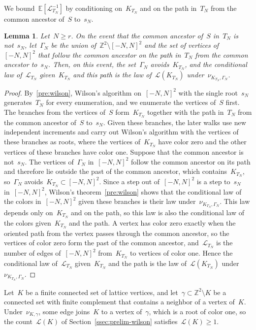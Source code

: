 \documentclass[11pt]{amsart}
\numberwithin{equation}{section}
\newtheorem{lemma}[equation]{Lemma}
\newcommand{\Z}{\mathbb Z}
\newcommand{\EE}{\mathbb E}
\newcommand{\cL}{\mathscr{L}}
\begin{document}
We bound~$\EE[\cL_{T_N}^{-1}]$ by conditioning on~$K_{T_N}$ and on the path in~$T_N$ from the common ancestor of~$S$ to~$s_N$.

\begin{lemma}\label{rd:conditional-law}
Let~$N\geq r$. On the event that the common ancestor of~$S$ in~$T_N$ is not~$s_N$, let~$\Gamma_N$ be the union of~$\Z^2\setminus [-N,N]^2$ and the set of vertices of~$[-N,N]^2$ that follow the common ancestor on the path in~$T_N$ from the common ancestor to~$s_N$. Then, on this event, the set~$\Gamma_N$ avoids~$K_{T_N}$, and the conditional law of~$\cL_{T_N}$ given~$K_{T_N}$ and this path is the law of~$\cL(K_{T_N})$ under~$\nu_{K_{T_N},\Gamma_N}$.
\end{lemma}

\begin{proof}
By~\eqref{pre:wilson}, Wilson's algorithm on~$[-N,N]^2$ with the single root~$s_N$ generates~$T_N$ for every enumeration, and we enumerate the vertices of~$S$ first. The branches from the vertices of~$S$ form~$K_{T_N}$ together with the path in~$T_N$ from the common ancestor of~$S$ to~$s_N$. Given these branches, the later walks use new independent increments and carry out Wilson's algorithm with the vertices of these branches as roots, where the vertices of~$K_{T_N}$ have color zero and the other vertices of these branches have color one. Suppose that the common ancestor is not~$s_N$. The vertices of~$\Gamma_N$ in~$[-N,N]^2$ follow the common ancestor on its path and therefore lie outside the past of the common ancestor, which contains~$K_{T_N}$, so~$\Gamma_N$ avoids~$K_{T_N}\subset [-N,N]^2$. Since a step out of~$[-N,N]^2$ is a step to~$s_N$ in~$[-N,N]^2$, Wilson's theorem~\eqref{pre:wilson} shows that the conditional law of the colors in~$[-N,N]^2$ given these branches is their law under~$\nu_{K_{T_N},\Gamma_N}$. This law depends only on~$K_{T_N}$ and on the path, so this law is also the conditional law of the colors given~$K_{T_N}$ and the path. A vertex has color zero exactly when the oriented path from the vertex passes through the common ancestor, so the vertices of color zero form the past of the common ancestor, and~$\cL_{T_N}$ is the number of edges of~$[-N,N]^2$ from~$K_{T_N}$ to vertices of color one. Hence the conditional law of~$\cL_{T_N}$ given~$K_{T_N}$ and the path is the law of~$\cL(K_{T_N})$ under~$\nu_{K_{T_N},\Gamma_N}$.
\end{proof}

Let~$K$ be a finite connected set of lattice vertices, and let~$\gamma\subset\Z^2\setminus K$ be a connected set with finite complement that contains a neighbor of a vertex of~$K$. Under~$\nu_{K,\gamma}$, some edge joins~$K$ to a vertex of~$\gamma$, which is a root of color one, so the count~$\cL(K)$ of Section~\ref{ssec:prelim-wilson} satisfies~$\cL(K)\geq1$.
\end{document}
